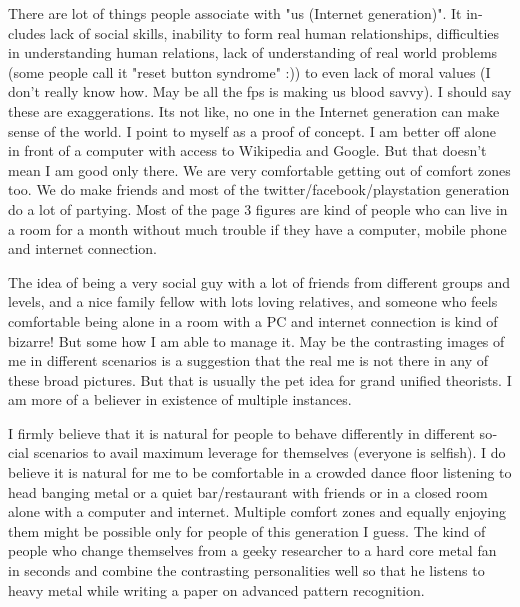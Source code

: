 \begin{english}
There are lot of things people associate with "us (Internet generation)". It includes lack of social skills, inability to 
form real human relationships, difficulties in understanding human relations, lack of understanding of real world 
problems (some people call it "reset button syndrome" :)) to even lack of moral values (I don't really know how. 
May be all the fps is making us blood savvy). I should say these are exaggerations. Its not like, no one in the 
Internet generation can make sense of the world. I point to myself as a proof of concept. I am better off alone in 
front of a computer with access to Wikipedia and Google. But that doesn't mean I am good only there. We are very 
comfortable getting out of comfort zones too. We do make friends and most of the twitter/facebook/playstation 
generation do a lot of partying. Most of the page 3 figures are kind of people who can live in a room for a month 
without much trouble if they have a computer, mobile phone and internet connection. 

The idea of being a very social guy with a lot of friends from different groups and levels, and a nice family fellow 
with lots loving relatives, and someone who feels comfortable being alone in a room with a PC and internet 
connection is kind of bizarre! But some how I am able to manage it. May be the contrasting images of me in 
different scenarios is a suggestion that the real me is not there in any of these broad pictures. But that is usually 
the pet idea for grand unified theorists. I am more of a believer in existence of multiple instances. 

I firmly believe that it is natural for people to behave differently in different social scenarios to avail maximum 
leverage for themselves (everyone is selfish). I do believe it is natural for me to be comfortable in a crowded 
dance floor listening to head banging metal or a quiet bar/restaurant with friends or in a closed room alone with 
a computer and internet. Multiple comfort zones and equally enjoying them might be possible only for people of 
this generation I guess. The kind of people who change themselves from a geeky researcher to a hard core 
metal fan in seconds and combine the contrasting personalities well so that he listens to heavy metal while 
writing a paper on advanced pattern recognition. 


\end{english}
